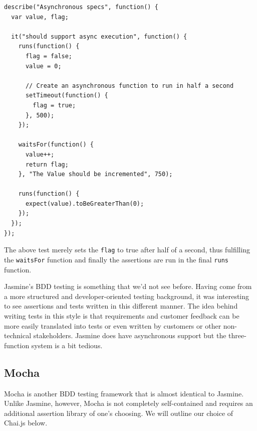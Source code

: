 \documentclass[12pt]{ucthesis}
\begin{document}
\begin{lstlisting}
describe("Asynchronous specs", function() {
  var value, flag;

  it("should support async execution", function() {
    runs(function() {
      flag = false;
      value = 0;

      // Create an asynchronous function to run in half a second
      setTimeout(function() {
        flag = true;
      }, 500);
    });

    waitsFor(function() {
      value++;
      return flag;
    }, "The Value should be incremented", 750);

    runs(function() {
      expect(value).toBeGreaterThan(0);
    });
  });
});
\end{lstlisting}

The above test merely sets the \lstinline{flag} to true after half of a second, thus fulfilling the \lstinline{waitsFor} function and finally the assertions are run in the final \lstinline{runs} function.

Jasmine's BDD testing is something that we'd not see before. Having come from a more structured and developer-oriented testing background, it was interesting to see assertions and tests written in this different manner. The idea behind writing tests in this style is that requirements and customer feedback can be more easily translated into tests or even written by customers or other non-technical stakeholders. Jasmine does have asynchronous support but the three-function system is a bit tedious.

\subsection{Mocha}
Mocha\cite{Mocha} is another BDD testing framework that is almost identical to Jasmine. Unlike Jasmine, however, Mocha is not completely self-contained and requires an additional assertion library of one's choosing. We will outline our choice of Chai.js below.
\end{document}
